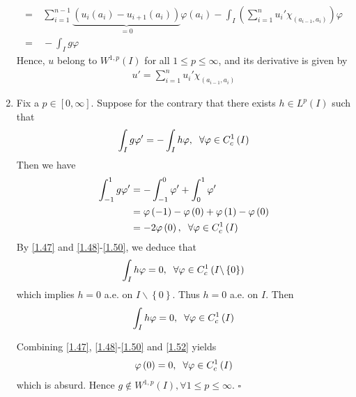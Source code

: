 \documentclass[a4paper,oneside]{book}
\numberwithin{equation}{chapter}
\begin{document}
\begin{enumerate}
\begin{align}
=&\ \sum\limits_{i = 1}^{n - 1} {\underbrace {\left( {{u_i}\left( {{a_i}} \right) - {u_{i + 1}}\left( {{a_i}} \right)} \right)}_{ = 0}\varphi \left( {{a_i}} \right)}  - \int_I {\left( {\sum\limits_{i = 1}^n {{u_i}'{\chi _{\left( {{a_{i - 1}},{a_i}} \right)}}} } \right)\varphi } \\
=&\  - \int_I {g\varphi } 
\end{align}
Hence, $u$ belong to $W^{1,p}\left(I\right)$ for all $1 \le p \le \infty$, and its derivative is given by
\begin{align}
u' = \sum\limits_{i = 1}^n {{u_i}'{\chi _{\left( {{a_{i - 1}},{a_i}} \right)}}} 
\end{align}
\item Fix a $p\in \left[0,\infty\right]$. Suppose for the contrary that there exists $h \in {L^p}\left( I \right)$ such that
\begin{align}
\label{1.47}
\int_I {g\varphi '}  =  - \int_I {h\varphi } ,\hspace{0.2cm}\forall \varphi  \in C_c^1\left( I \right)
\end{align}
Then we have
\begin{align}
\label{1.48}
\int_{ - 1}^1 {g\varphi '}  &=  - \int_{ - 1}^0 {\varphi '}  + \int_0^1 {\varphi '} \\
 &= \varphi \left( { - 1} \right) - \varphi \left( 0 \right) + \varphi \left( 1 \right) - \varphi \left( 0 \right)\\
 &=  - 2\varphi \left( 0 \right),\hspace{0.2cm}\forall \varphi  \in C_c^1\left( I \right) \label{1.50}
\end{align}
By \eqref{1.47} and \eqref{1.48}-\eqref{1.50}, we deduce that
\begin{align}
\int_I {h\varphi }  = 0,\hspace{0.2cm}\forall \varphi  \in C_c^1\left( {I\backslash \left\{ 0 \right\}} \right)
\end{align}
which implies $h=0$ a.e. on $I\backslash \left\{ 0 \right\}$. Thus $h=0$ a.e. on $I$. Then
\begin{align}
\label{1.52}
\int_I {h\varphi }  = 0,\hspace{0.2cm}\forall \varphi  \in C_c^1\left( I \right)
\end{align}

Combining \eqref{1.47}, \eqref{1.48}-\eqref{1.50} and \eqref{1.52} yields
\begin{align}
\varphi \left( 0 \right) = 0,\hspace{0.2cm}\forall \varphi  \in C_c^1\left( I \right)
\end{align}
which is absurd. Hence $g \notin {W^{1,p}}\left( I \right),\forall 1 \le p \le \infty $. \hfill $\square$\end{enumerate}
\end{document}
